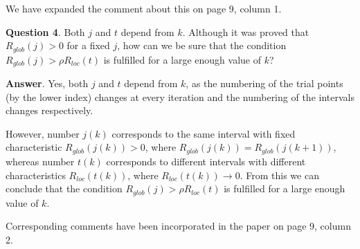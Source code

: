 \documentclass[12pt]{article}%
\begin{document}
We have expanded the comment about this on page 9, column 1.

\phantom{f}

\textbf{Question 4}. Both $j$ and $t$ depend from $k$. Although it was proved that $R_{glob}(j) > 0$ for a
fixed $j$, how can we be sure that the condition $R_{glob}(j) > \rho R_{loc}(t)$ is fulfilled for a large enough value of $k$?


\textbf{Answer}.
Yes, both $j$ and $t$ depend from $k$, as the numbering of the trial points (by the lower index) changes at every iteration and the numbering of the intervals changes respectively.

However, number $j(k)$ corresponds to the same interval with fixed characteristic $R_{glob}(j(k))>0$, where $R_{glob}(j(k))= R_{glob}(j(k+1))$, whereas number $t(k)$ corresponds to different intervals with different characteristics $R_{loc}(t(k))$, where $R_{loc}(t(k)) \rightarrow 0$. 
From this we can conclude that the condition $R_{glob}(j) > \rho R_{loc}(t)$ is fulfilled for a large enough value of $k$.

Corresponding comments have been incorporated in the paper on page 9, column 2.
\end{document}
